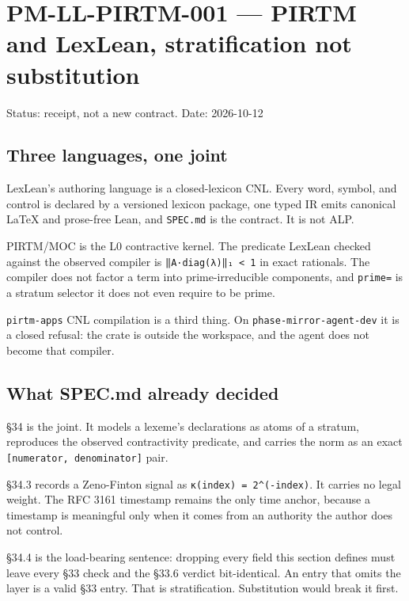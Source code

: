 \documentclass[
]{article}
\author{}
\date{}
\begin{document}
\hypertarget{pm-ll-pirtm-001-pirtm-and-lexlean-stratification-not-substitution}{%
\section{PM-LL-PIRTM-001 --- PIRTM and LexLean, stratification not
substitution}\label{pm-ll-pirtm-001-pirtm-and-lexlean-stratification-not-substitution}}

Status: receipt, not a new contract. Date: 2026-10-12

\hypertarget{three-languages-one-joint}{%
\subsection{Three languages, one
joint}\label{three-languages-one-joint}}

LexLean's authoring language is a closed-lexicon CNL. Every word,
symbol, and control is declared by a versioned lexicon package, one
typed IR emits canonical LaTeX and prose-free Lean, and \texttt{SPEC.md}
is the contract. It is not ALP.

PIRTM/MOC is the L0 contractive kernel. The predicate LexLean checked
against the observed compiler is \texttt{‖A·diag(λ)‖₁\ \textless{}\ 1}
in exact rationals. The compiler does not factor a term into
prime-irreducible components, and \texttt{prime=} is a stratum selector
it does not even require to be prime.

\texttt{pirtm-apps} CNL compilation is a third thing. On
\texttt{phase-mirror-agent-dev} it is a closed refusal: the crate is
outside the workspace, and the agent does not become that compiler.

\hypertarget{what-spec.md-already-decided}{%
\subsection{What SPEC.md already
decided}\label{what-spec.md-already-decided}}

§34 is the joint. It models a lexeme's declarations as atoms of a
stratum, reproduces the observed contractivity predicate, and carries
the norm as an exact \texttt{{[}numerator,\ denominator{]}} pair.

§34.3 records a Zeno-Finton signal as
\texttt{κ(index)\ =\ 2\^{}(-index)}. It carries no legal weight. The RFC
3161 timestamp remains the only time anchor, because a timestamp is
meaningful only when it comes from an authority the author does not
control.

§34.4 is the load-bearing sentence: dropping every field this section
defines must leave every §33 check and the §33.6 verdict bit-identical.
An entry that omits the layer is a valid §33 entry. That is
stratification. Substitution would break it first.
\end{document}
